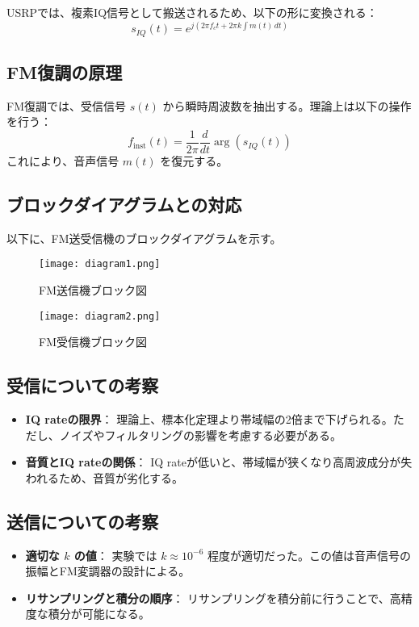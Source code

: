 \documentclass[a4paper, twocolumn]{article} %
\begin{document}
USRPでは、複素IQ信号として搬送されるため、以下の形に変換される：
\[
s_{IQ}(t) = e^{j \left( 2 \pi f_c t + 2 \pi k \int m(t) \, dt \right)}
\]

\subsection*{FM復調の原理}
FM復調では、受信信号 \(s(t)\) から瞬時周波数を抽出する。理論上は以下の操作を行う：
\[
f_{\text{inst}}(t) = \frac{1}{2 \pi} \frac{d}{dt} \arg \left( s_{IQ}(t) \right)
\]
これにより、音声信号 \(m(t)\) を復元する。

\subsection*{ブロックダイアグラムとの対応}
以下に、FM送受信機のブロックダイアグラムを示す。

\begin{figure}[h]
    \centering
    \texttt{[image: diagram1.png]}
    \caption{FM送信機ブロック図}
\end{figure}

\begin{figure}[h]
    \centering
    \texttt{[image: diagram2.png]}
    \caption{FM受信機ブロック図}
\end{figure}

\subsection*{受信についての考察}
\begin{itemize}
    \item \textbf{IQ rateの限界}：
    理論上、標本化定理より帯域幅の2倍まで下げられる。ただし、ノイズやフィルタリングの影響を考慮する必要がある。
    \item \textbf{音質とIQ rateの関係}：
    IQ rateが低いと、帯域幅が狭くなり高周波成分が失われるため、音質が劣化する。
\end{itemize}

\subsection*{送信についての考察}
\begin{itemize}
    \item \textbf{適切な \(k\) の値}：
    実験では \(k \approx 10^{-6}\) 程度が適切だった。この値は音声信号の振幅とFM変調器の設計による。
    \item \textbf{リサンプリングと積分の順序}：
    リサンプリングを積分前に行うことで、高精度な積分が可能になる。
\end{itemize}
\end{document}
